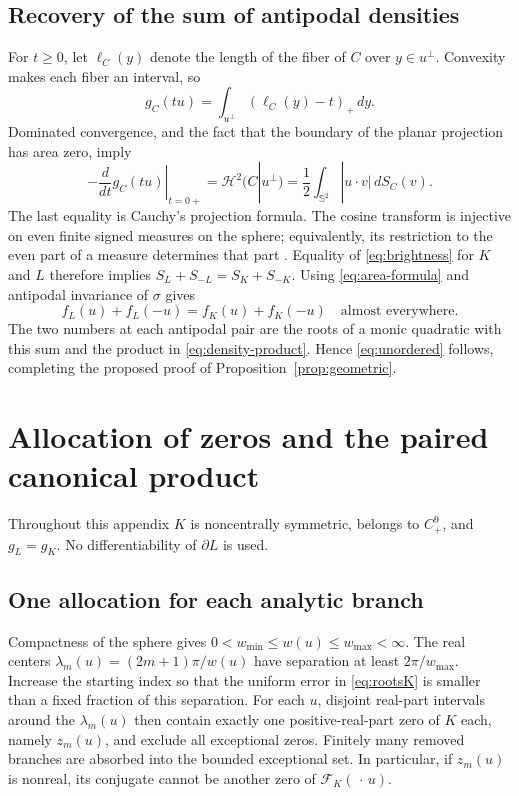\documentclass[11pt,a4paper]{article}
\theoremstyle{definition}
\theoremstyle{remark}
\newcommand{\Sph}{\mathbb S^2}
\newcommand{\area}{\mathcal H^2}
\newcommand{\F}{\mathcal F}
\numberwithin{equation}{section}
\begin{document}
\subsection{Recovery of the sum of antipodal densities}
For $t\ge0$, let $\ell_C(y)$ denote the length of the fiber of $C$
over $y\in u^\perp$. Convexity makes each fiber an interval, so
\[
 g_C(tu)=\int_{u^\perp}(\ell_C(y)-t)_+\,dy .
\]
Dominated convergence, and the fact that the boundary of the planar
projection has area zero, imply
\begin{equation}\label{eq:brightness}
 -\left.\frac{d}{dt}g_C(tu)\right|_{t=0+}
 =\area(C|u^\perp)
 =\frac12\int_{\Sph}|u\cdot v|\,dS_C(v).
\end{equation}
The last equality is Cauchy's projection formula. The cosine transform
is injective on even finite signed measures on the sphere; equivalently,
its restriction to the even part of a measure determines that part
\cite{Schneider}. Equality of \eqref{eq:brightness} for $K$ and $L$
therefore implies
$S_L+S_{-L}=S_K+S_{-K}$.
Using \eqref{eq:area-formula} and antipodal invariance of $\sigma$ gives
\begin{equation}\label{eq:density-sum}
 f_L(u)+f_L(-u)=f_K(u)+f_K(-u)\quad\text{almost everywhere}.
\end{equation}
The two numbers at each antipodal pair are the roots of a monic quadratic
with this sum and the product in \eqref{eq:density-product}. Hence
\eqref{eq:unordered} follows, completing the proposed proof of
Proposition~\ref{prop:geometric}.
\section{Allocation of zeros and the paired canonical product}\label{app:allocation}
Throughout this appendix $K$ is noncentrally symmetric, belongs to $C^9_+$,
and $g_L=g_K$. No differentiability of $\partial L$ is used.

\subsection{One allocation for each analytic branch}
Compactness of the sphere gives $0<w_{\min}\le w(u)\le w_{\max}<\infty$.
The real centers $\lambda_m(u)=(2m+1)\pi/w(u)$ have separation
at least $2\pi/w_{\max}$. Increase the starting index so that
the uniform error in \eqref{eq:rootsK} is smaller than a fixed fraction
of this separation. For each $u$, disjoint real-part intervals around
the $\lambda_m(u)$ then contain exactly one positive-real-part zero
of $K$ each, namely $z_m(u)$, and exclude all exceptional zeros.
Finitely many removed branches are absorbed into the bounded exceptional set.
In particular, if $z_m(u)$ is nonreal, its conjugate cannot be another
zero of $\F_K(\,\cdot\,u)$.
\end{document}
